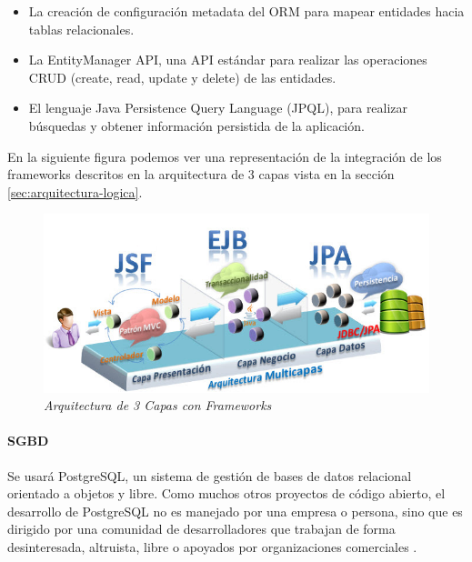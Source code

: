 \begin{itemize}
\begin{itemize}
\item La creación de configuración metadata del ORM para mapear entidades hacia tablas relacionales.
\item La EntityManager API, una API estándar para realizar las operaciones CRUD (create, read, update y delete) de las entidades.
\item El lenguaje Java Persistence Query Language (JPQL), para realizar búsquedas y obtener información persistida de la aplicación.
\end {itemize}

\end {itemize}

En la siguiente figura podemos ver una representación de la integración de los frameworks descritos en la arquitectura de 3 capas vista en la sección \ref{sec:arquitectura-logica}.

\vspace{10mm}

\begin{figure}[H]
\centering
  \includegraphics[scale=.60]{img/arquitectura-jee.jpg}
  \caption{\textit{Arquitectura de 3 Capas con Frameworks}}
  \label{fig:arquitectura-jee}
\end{figure}

\vspace{10mm}

\paragraph*{SGBD}

Se usará PostgreSQL, un sistema de gestión de bases de datos relacional orientado a objetos y libre. Como muchos otros proyectos de código abierto, el desarrollo de PostgreSQL no es manejado por una empresa o persona, sino que es dirigido por una comunidad de desarrolladores que trabajan de forma desinteresada, altruista, libre o apoyados por organizaciones comerciales \cite{PostgreSQL}.\\ 

